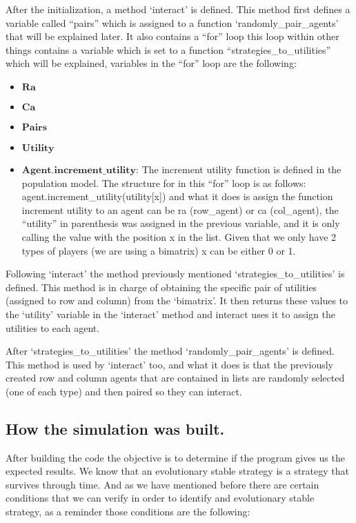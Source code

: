 \documentclass{article}
\begin{document}
After the initialization, a method `interact’ is defined. This method first defines a variable called ``pairs'' which is assigned to a function `randomly\_pair\_agents’ that will be explained later. It also contains a ``for'' loop this loop within other things contains a variable which is set to a function ``strategies\_to\_utilities'' which will be explained, variables in the ``for'' loop are the following:

\begin{itemize}
\item $\textbf{Ra}$
\item $\textbf{Ca}$
\item $\textbf{Pairs}$
\item $\textbf{Utility}$
\item $\textbf{Agent.increment\_utility}$: The increment utility function is defined in the population model. The structure for in this “for” loop is as follows:
\\ agent.increment\_utility(utility[x]) and what it does is assign the function increment utility to an agent can be ra (row\_agent) or ca (col\_agent), the ``utility'' in parenthesis was assigned in the previous variable, and it is only calling the value with the position x in the list. Given that we only have 2 types of players (we are using a bimatrix) x can be either 0 or 1.
\end{itemize}

Following `interact’ the method previously mentioned `strategies\_to\_utilities’ is defined. This method is in charge of obtaining the specific pair of utilities (assigned to row and column) from the ‘bimatrix’. It then returns these values to the `utility’ variable in the `interact’ method and interact uses it to assign the utilities to each agent.

After `strategies\_to\_utilities’ the method `randomly\_pair\_agents’ is defined. This method is used by `interact’ too, and what it does is that the previously created row and column agents that are contained in lists are randomly selected (one of each type) and then paired so they can interact.

\subsection{How the simulation was built.}
After building the code the objective is to determine if the program gives us the expected results. We know that an evolutionary stable strategy is a strategy that survives through time. And as we have mentioned before there are certain conditions that we can verify in order to identify and evolutionary stable strategy, as a reminder those conditions are the following:
\end{document}

